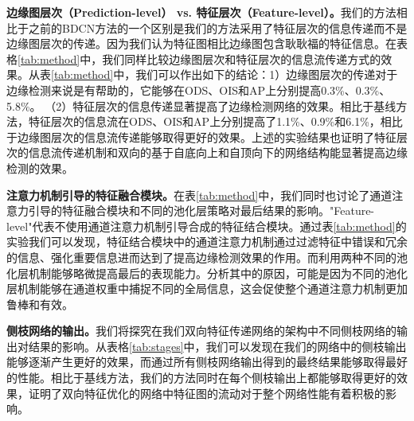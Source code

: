 \documentclass[master]{thesis-uestc}
\begin{document}
{\textbf{边缘图层次（Prediction-level） vs. 特征层次（Feature-level）。}我们的方法相比于之前的BDCN方法的一个区别是我们的方法采用了特征层次的信息传递而不是边缘图层次的传递。因为我们认为特征图相比边缘图包含耿耿福的特征信息。在表格\ref{tab:method}中，我们同样比较边缘图层次和特征层次的信息流传递方式的效果。从表\ref{tab:method}中，我们可以作出如下的结论：1）边缘图层次的传递对于边缘检测来说是有帮助的，它能够在ODS、OIS和AP上分别提高0.3\%、0.3\%、5.8\%。 （2）特征层次的信息传递显著提高了边缘检测网络的效果。相比于基线方法，特征层次的信息流在ODS、OIS和AP上分别提高了1.1\%、0.9\%和6.1\%，相比于边缘图层次的信息流传递能够取得更好的效果。上述的实验结果也证明了特征层次的信息流传递机制和双向的基于自底向上和自顶向下的网络结构能显著提高边缘检测的效果。
\begin{table}
    \centering
    \caption{不同的信息传递机制和注意力机制引导的特征融合网络的消融实验效果}

\label{tab:method}
\end{table}

\textbf{注意力机制引导的特征融合模块。}在表\ref{tab:method}中，我们同时也讨论了通道注意力引导的特征融合模块和不同的池化层策略对最后结果的影响。"Feature-level"代表不使用通道注意力机制引导合成的特征结合模块。通过表\ref{tab:method}的实验我们可以发现，特征结合模块中的通道注意力机制通过过滤特征中错误和冗余的信息、强化重要信息进而达到了提高边缘检测效果的作用。而利用两种不同的池化层机制能够略微提高最后的表现能力。分析其中的原因，可能是因为不同的池化层机制能够在通道权重中捕捉不同的全局信息，这会促使整个通道注意力机制更加鲁棒和有效。


\textbf{侧枝网络的输出。}我们将探究在我们双向特征传递网络的架构中不同侧枝网络的输出对结果的影响。从表格\ref{tab:stages}中，我们可以发现在我们的网络中的侧枝输出能够逐渐产生更好的效果，而通过所有侧枝网络输出得到的最终结果能够取得最好的性能。相比于基线方法，我们的方法同时在每个侧枝输出上都能够取得更好的效果，证明了双向特征优化的网络中特征图的流动对于整个网络性能有着积极的影响。


}
\end{document}
